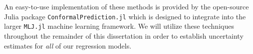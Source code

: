 An easy-to-use implementation of these methods is provided by the open-source Julia package \texttt{ConformalPrediction.jl} which is designed to integrate into the larger \texttt{MLJ.jl} machine learning framework. We will utilize these techniques throughout the remainder of this dissertation in order to establish uncertainty estimates for \textit{all} of our regression models.











